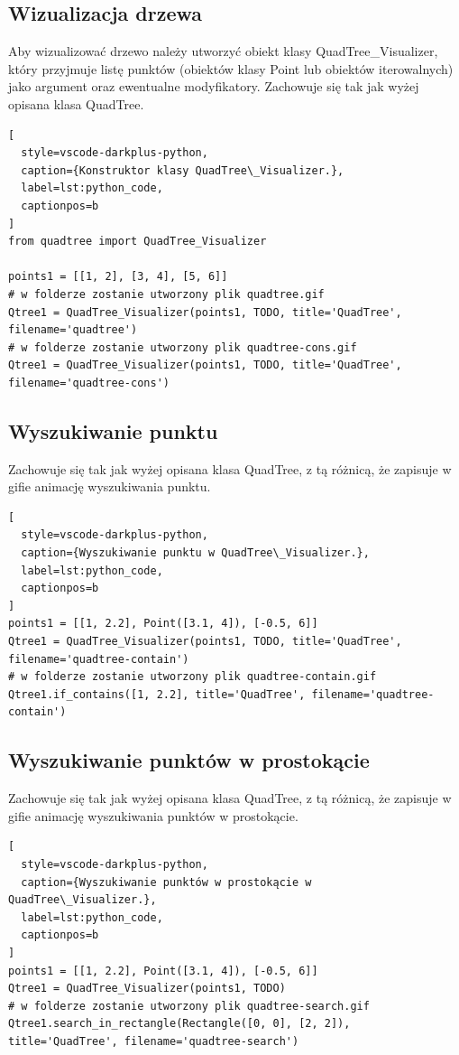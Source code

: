 \documentclass{lab}
\begin{document}
\subsection{Wizualizacja drzewa}
Aby wizualizować drzewo należy utworzyć obiekt klasy QuadTree\_Visualizer, który przyjmuje listę punktów (obiektów klasy Point lub obiektów iterowalnych) jako argument oraz ewentualne modyfikatory. Zachowuje się tak jak wyżej opisana klasa QuadTree.
\begin{lstlisting}[
  style=vscode-darkplus-python,
  caption={Konstruktor klasy QuadTree\_Visualizer.},
  label=lst:python_code,
  captionpos=b
]
from quadtree import QuadTree_Visualizer

points1 = [[1, 2], [3, 4], [5, 6]]
# w folderze zostanie utworzony plik quadtree.gif
Qtree1 = QuadTree_Visualizer(points1, TODO, title='QuadTree', filename='quadtree')
# w folderze zostanie utworzony plik quadtree-cons.gif
Qtree1 = QuadTree_Visualizer(points1, TODO, title='QuadTree', filename='quadtree-cons')
\end{lstlisting}

\subsection{Wyszukiwanie punktu}
Zachowuje się tak jak wyżej opisana klasa QuadTree, z tą różnicą, że zapisuje w gifie animację wyszukiwania punktu.
\begin{lstlisting}[
  style=vscode-darkplus-python,
  caption={Wyszukiwanie punktu w QuadTree\_Visualizer.},
  label=lst:python_code,
  captionpos=b
]
points1 = [[1, 2.2], Point([3.1, 4]), [-0.5, 6]]
Qtree1 = QuadTree_Visualizer(points1, TODO, title='QuadTree', filename='quadtree-contain')
# w folderze zostanie utworzony plik quadtree-contain.gif
Qtree1.if_contains([1, 2.2], title='QuadTree', filename='quadtree-contain')
\end{lstlisting}

\subsection{Wyszukiwanie punktów w prostokącie}
Zachowuje się tak jak wyżej opisana klasa QuadTree, z tą różnicą, że zapisuje w gifie animację wyszukiwania punktów w prostokącie.
\begin{lstlisting}[
  style=vscode-darkplus-python,
  caption={Wyszukiwanie punktów w prostokącie w QuadTree\_Visualizer.},
  label=lst:python_code,
  captionpos=b
]
points1 = [[1, 2.2], Point([3.1, 4]), [-0.5, 6]]
Qtree1 = QuadTree_Visualizer(points1, TODO)
# w folderze zostanie utworzony plik quadtree-search.gif
Qtree1.search_in_rectangle(Rectangle([0, 0], [2, 2]), title='QuadTree', filename='quadtree-search')
\end{lstlisting}
\end{document}
